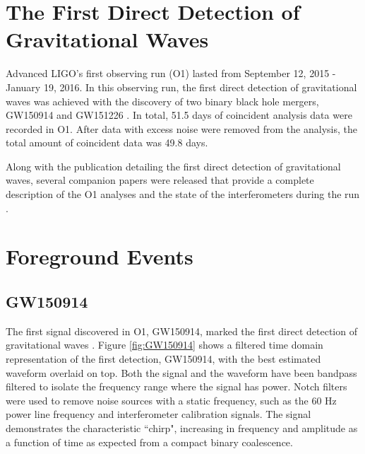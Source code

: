 \section{The First Direct Detection of Gravitational Waves}

Advanced LIGO's first observing run (O1) lasted from September 12, 2015 - 
January 19, 2016. In this observing run, the first direct detection of 
gravitational waves was achieved with the discovery of two binary black 
hole mergers, GW150914 and GW151226 \cite{GW150914-DETECTION,GW151226}. 
In total, 51.5 days of coincident analysis data were recorded in O1. 
After data with excess noise were removed from the analysis, the 
total amount of coincident data was 49.8 days.

Along with the publication detailing the first direct detection of 
gravitational waves, several companion papers were released 
that provide a complete description of the O1 analyses and the state 
of the interferometers during the run 
\cite{GW150914-BURST,GW150914-CBC,GW150914-PARAMESTIM,GW150914-RATES,
GW150914-ASTRO,GW150914-TESTOFGR,GW150914-STOCHASTIC,GW150914-CALIBRATION,
GW150914-DETCHAR,GW150914-DETECTORS,GW150914-EMFOLLOW,GW150914-HEN,
GW150914-ACCURACY}. 

\section{Foreground Events}

\subsection{GW150914}

The first signal discovered in O1, GW150914, marked the first 
direct detection of gravitational waves \cite{GW150914-DETECTION}.
Figure \ref{fig:GW150914} shows a 
filtered time domain representation of the first detection, 
GW150914, with the best estimated 
waveform overlaid on top. Both the signal and the waveform have been 
bandpass filtered to isolate the frequency range where the signal has 
power. Notch filters were used to remove noise sources with a static 
frequency, such as the 60 Hz power line frequency and 
interferometer calibration signals. 
The signal demonstrates the characteristic ``chirp", 
increasing in frequency and amplitude as a function of time as  
expected from a compact binary coalescence. 

